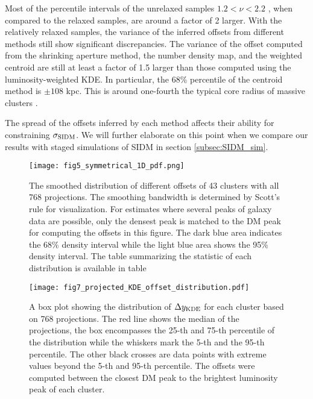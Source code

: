 Most of the percentile intervals of the unrelaxed samples $ 1.2 < \nu < 2.2$ , 
when compared to the relaxed samples, are around a factor of 2 larger. 
With the relatively relaxed samples, the variance of the inferred offsets from different
methods still show significant discrepancies. 
The variance of the offset computed from the shrinking aperture method, 
the number density map, and the weighted centroid are still at least a factor of 1.5
larger than those computed using the luminosity-weighted KDE. 
In particular, the 68\% percentile of the centroid method is $\pm 108$ kpc.
This is around one-fourth the typical core radius of massive clusters
\citep{Allen1998}.  
 
The spread of the offsets inferred by each method affects their ability
for constraining $\sigma_{\rm SIDM}$. We will further elaborate on this point
when we compare our results with staged simulations of SIDM in section
\ref{subsec:SIDM_sim}. 

\begin{figure*}
	\begin{center}
	\texttt{[image: fig5\_symmetrical\_1D\_pdf.png]}
	\caption{ 		
		The smoothed distribution of different offsets of 43 clusters with all 768
		projections. The smoothing bandwidth is determined by Scott's rule for 
		visualization.
		For estimates where several peaks of galaxy data are 
		possible, only the densest peak is matched to the DM peak for computing
		the offsets in this figure. 
		The dark blue area indicates the 68\% density interval
		while the light blue area shows the 95\% density interval. 
		The table summarizing the statistic of each distribution is available in
		table 
		\label{fig:offset_distributions}
	}
\end{center}
\end{figure*}

\begin{figure*}
	\begin{center}
	\texttt{[image: fig7\_projected\_KDE\_offset\_distribution.pdf]}
	\caption{A box plot showing the distribution of $\Delta y_{\rm KDE}$ for each cluster 
		based on 768 projections. The red line shows the median of the projections,
		the box encompasses the 25-th and 75-th percentile of the distribution while
		the whiskers mark the 5-th and the 95-th percentile. The other black crosses
		are data points with extreme values beyond the 5-th and 95-th percentile.
		The offsets were computed between the closest DM 
		peak to the brightest luminosity peak of each cluster. 		
		\label{fig:projected_KDE_offset_distribution}
	}
\end{center}
\end{figure*}


